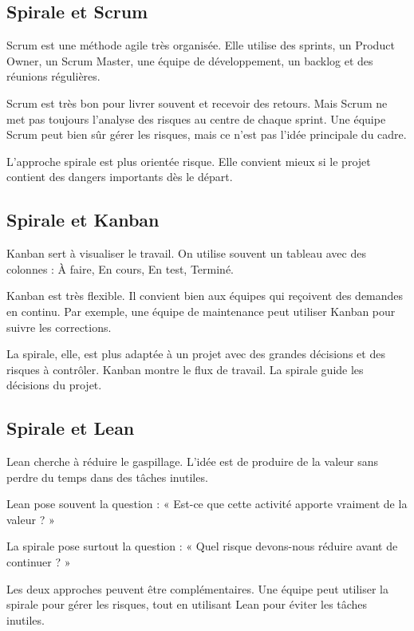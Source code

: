 \documentclass[12pt,a4paper]{article}
\begin{document}
\subsection{Spirale et Scrum}

Scrum est une méthode agile très organisée. Elle utilise des sprints, un Product Owner, un Scrum Master, une équipe de développement, un backlog et des réunions régulières.

Scrum est très bon pour livrer souvent et recevoir des retours. Mais Scrum ne met pas toujours l'analyse des risques au centre de chaque sprint. Une équipe Scrum peut bien sûr gérer les risques, mais ce n'est pas l'idée principale du cadre.

L'approche spirale est plus orientée risque. Elle convient mieux si le projet contient des dangers importants dès le départ.

\subsection{Spirale et Kanban}

Kanban sert à visualiser le travail. On utilise souvent un tableau avec des colonnes : À faire, En cours, En test, Terminé.

Kanban est très flexible. Il convient bien aux équipes qui reçoivent des demandes en continu. Par exemple, une équipe de maintenance peut utiliser Kanban pour suivre les corrections.

La spirale, elle, est plus adaptée à un projet avec des grandes décisions et des risques à contrôler. Kanban montre le flux de travail. La spirale guide les décisions du projet.

\subsection{Spirale et Lean}

Lean cherche à réduire le gaspillage. L'idée est de produire de la valeur sans perdre du temps dans des tâches inutiles.

Lean pose souvent la question : « Est-ce que cette activité apporte vraiment de la valeur ? »

La spirale pose surtout la question : « Quel risque devons-nous réduire avant de continuer ? »

Les deux approches peuvent être complémentaires. Une équipe peut utiliser la spirale pour gérer les risques, tout en utilisant Lean pour éviter les tâches inutiles.
\end{document}

